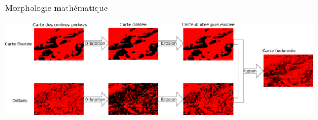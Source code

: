 \documentclass{beamer}
\begin{document}
\begin{frame}[noframenumbering]{Morphologie mathématique}
\begin{center} 
   	\includegraphics[width=1.0\linewidth]{Schema/pyramide_Laplace_image_morpho.png}
\end{center}
\end{frame}
\end{document}
